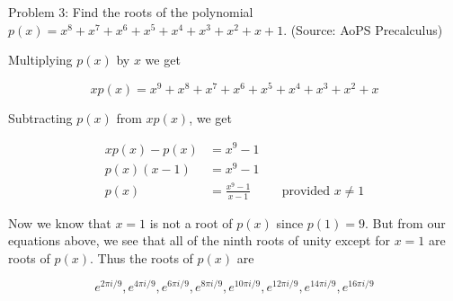 Problem 3: Find the roots of the polynomial $p(x) = x^8 + x^7 + x^6 + x^5 + x^4 + x^3 + x^2 + x + 1$. (Source: AoPS Precalculus)

Multiplying $p(x)$ by $x$ we get

$$ xp(x) = x^9 + x^8 + x^7 + x^6 + x^5 + x^4 + x^3 + x^2 + x $$

Subtracting $p(x)$ from $xp(x)$, we get

\begin{align*}
xp(x) - p(x) &= x^9 - 1 \\
p(x)(x - 1) &= x^9 - 1 \\
p(x) &= \frac{x^9 - 1}{x - 1} &\quad \text{provided $x \neq 1$}
\end{align*}

Now we know that $x = 1$ is not a root of $p(x)$ since $p(1) = 9$. But from our equations above, we see that all of the ninth roots of unity except for $x = 1$ are roots of $p(x)$. Thus the roots of $p(x)$ are

$$ \boxed{e^{2\pi i / 9}, e^{4\pi i / 9}, e^{6\pi i / 9}, e^{8\pi i / 9}, e^{10\pi i / 9}, e^{12\pi i / 9}, e^{14\pi i / 9}, e^{16\pi i / 9}} $$
